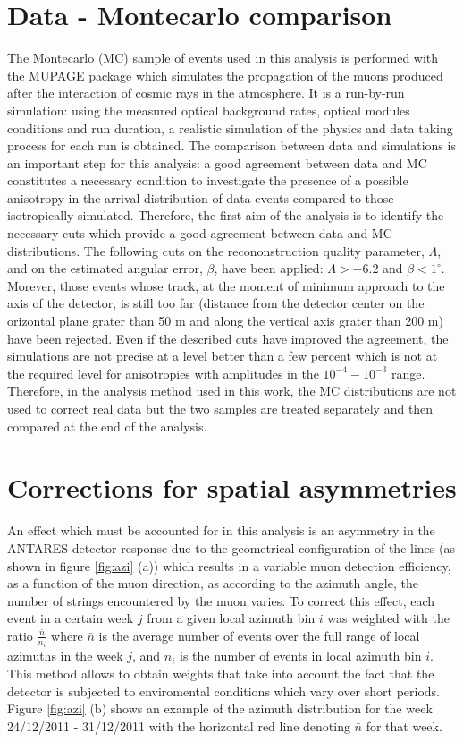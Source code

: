 \documentclass[a4paper]{jpconf}
\begin{document}
\section{Data - Montecarlo comparison}
The Montecarlo (MC) sample of events used in this analysis is performed with the MUPAGE \cite{mupage} package which simulates the propagation of the muons produced after the interaction of cosmic rays in the atmosphere. It is a run-by-run simulation: using the measured optical background rates, optical modules conditions and run duration, a realistic simulation of the physics and data taking process for each run is obtained. The comparison between data and simulations is an important step for this analysis: a good agreement between data and MC constitutes a necessary condition to investigate the presence of a possible anisotropy in the arrival distribution of data events compared to those isotropically simulated. Therefore, the first aim of the analysis is to identify the necessary cuts which provide a good agreement between data and MC distributions. The following cuts on the recononstruction quality parameter, $\Lambda$, and on the estimated angular error, $\beta$, have been applied: $\Lambda > -6.2$ and $\beta < 1^{\circ}$. Morever, those events whose track, at the moment of minimum approach to the axis of the detector, is still too far (distance from the detector center on the orizontal plane grater than 50 m and along the vertical axis grater than 200 m) have been rejected. Even if the described cuts have improved the agreement, the simulations are not precise at a level better than a few percent which is not at the required level  for anisotropies with amplitudes in the $10^{-4} - 10^{-3}$ range. Therefore,  in the analysis method used in this work, the MC distributions are not used to correct real data but the two samples are treated separately and then compared at the end of the analysis.  

\section{Corrections for spatial asymmetries}
An effect which must be accounted for in this analysis is an asymmetry in the ANTARES detector response due to the geometrical configuration of the lines (as shown in figure \ref {fig:azi} (a)) which results in a variable muon detection efficiency, as a function of the muon direction, as according to the azimuth angle, the number of strings encountered by the muon varies. To correct this effect, each event in a certain week $j$ from a given local azimuth bin $i$ was weighted with the ratio $\frac{\bar{n}}{n_i}$ where $\bar{n}$ is the average number of events over the full range of local azimuths in the week $j$, and $n_i$ is the number of events in local azimuth bin $i$.
This method allows to obtain weights that take into account the fact that the detector is subjected to enviromental conditions which vary over short periods. 
Figure \ref {fig:azi} (b) shows an example of the azimuth distribution for the week 24/12/2011 - 31/12/2011 with the horizontal red line denoting $\bar{n}$ for that week.
\end{document}
